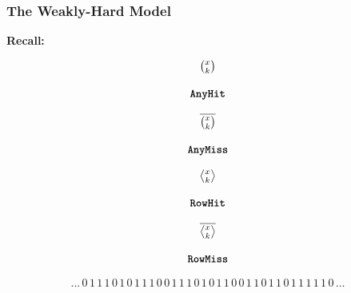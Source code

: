 \begin{frame}
    \frametitle{The Weakly-Hard Model}
    \textbf{Recall:}

    \begin{minipage}[c]{0.24\textwidth}
        \centering
        \begin{equation*}
            \begin{matrix}
                {\Large \binom{x_{}}{k_{}}}   \\
                            \\
                \texttt{\textbf{AnyHit}}{}
            \end{matrix}
        \end{equation*}
    \end{minipage}\hfill
    \begin{minipage}[c]{0.24\textwidth}
        \centering
        \begin{equation*}
            \begin{matrix}
                {\Large \overline{\binom{x_{}}{k_{}}}}   \\
                            \\
                \texttt{\textbf{AnyMiss}}{}
            \end{matrix}
        \end{equation*}
    \end{minipage}\hfill
    \begin{minipage}[c]{0.24\textwidth}
        \centering
        \begin{equation*}
            \begin{matrix}
                {\Large \rowhit{}}   \\
                            \\
                \tRH{}
            \end{matrix}
        \end{equation*}
    \end{minipage}\hfill
    \begin{minipage}[c]{0.24\textwidth}
        \centering
        \begin{equation*}
            \begin{matrix}
                {\Large \rowmiss{}}   \\
                            \\
                \tRM{}
            \end{matrix}
        \end{equation*}
    \end{minipage}

    \vspace{1cm}

    \begin{equation*}
        \ldots\, 0\, 1\, 1\, 1\, 0\, 1\, 0\, 1\, 1\, 1\, 0\, 0\, 1\, 1\, 1\, 0\, 1\, 0\, 1\, 1\, 0\, 0\, 1\, 1\, 0\, 1\, 1\, 0\, 1\, 1\, 1\, 1\, 1\, 0\, \ldots
    \end{equation*}
\end{frame}


